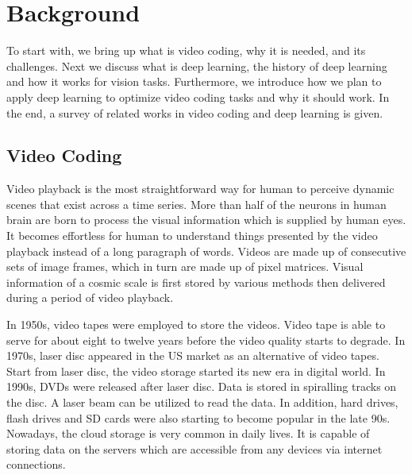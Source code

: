 \chapter{Background}\label{ch:chapter2} %
%
%
To start with, we bring up what is video coding, why it is needed, and
its challenges.
Next we discuss what is deep learning, the history of deep learning and how
it works for vision tasks.
Furthermore, we introduce how we plan to apply deep learning to optimize video
coding tasks and why it should work.
In the end, a survey of related works in video coding and deep learning is given.

%
\section{Video Coding}\label{sec:video-coding}
Video playback is the most straightforward way for human to perceive dynamic
scenes that exist across a time series.
More than half of the neurons in human brain are born to process the visual
information which is supplied by human eyes.
It becomes effortless for human to understand things presented by
the video playback instead of a long paragraph of words.
Videos are made up of consecutive sets of image frames, which in turn
are made up of pixel matrices.
Visual information of a cosmic scale is first stored by various methods
then delivered during a period of video playback.

In 1950s, video tapes were employed to store the videos.
Video tape is able to serve for about eight to twelve years
before the video quality starts to degrade.
In 1970s, laser disc appeared in the US market as an alternative of video tapes.
Start from laser disc, the video storage started its new era in digital world.
In 1990s, DVDs were released after laser disc.
Data is stored in spiralling tracks on the disc.
A laser beam can be utilized to read the data.
In addition, hard drives, flash drives and SD cards were also starting to
become popular in the late 90s.
Nowadays, the cloud storage is very common in daily lives.
It is capable of storing data on the servers which are
accessible from any devices via internet connections.

